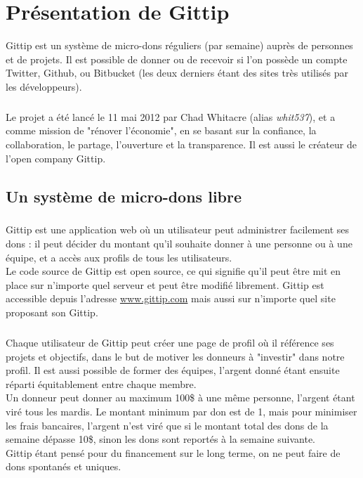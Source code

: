 \chapter{Présentation de Gittip}

Gittip est un système de micro-dons réguliers (par semaine) auprès de
personnes et de projets. Il est possible de donner ou de recevoir si l'on
possède un compte Twitter, Github, ou Bitbucket (les deux derniers étant
des sites très utilisés par les développeurs).

\paragraph{}
Le projet a été lancé le 11 mai 2012 par Chad Whitacre (alias \emph{whit537}),
et a comme mission de "rénover l'économie", en se basant sur la confiance,
la collaboration, le partage, l'ouverture et la transparence.
Il est aussi le créateur de l'open company Gittip.


    \section{Un système de micro-dons libre}

\paragraph{}
Gittip est une application web où un utilisateur peut administrer facilement
ses dons : il peut décider du montant qu'il souhaite donner à une personne
ou à une équipe, et a accès aux profils de tous les utilisateurs.\\
Le code source de Gittip est open source, ce qui signifie qu'il peut être
mit en place sur n'importe quel serveur et peut être modifié librement.
Gittip est accessible depuis l'adresse \url{www.gittip.com} mais aussi sur
n'importe quel site proposant son Gittip.

\paragraph{}
Chaque utilisateur de Gittip peut créer une page de profil où il référence
ses projets et objectifs, dans le but de motiver les donneurs à "investir"
dans notre profil. Il est aussi possible de former des équipes, l'argent
donné étant ensuite réparti équitablement entre chaque membre.\\
Un donneur peut donner au maximum 100\${} à une même personne, l'argent
étant viré tous les mardis. Le montant minimum par don est de 1\textcent, mais
pour minimiser les frais bancaires, l'argent n'est viré que si le montant
total des dons de la semaine dépasse 10\${}, sinon les dons sont reportés à
la semaine suivante.\\
Gittip étant pensé pour du financement sur le long terme, on ne peut faire
de dons spontanés et uniques.

